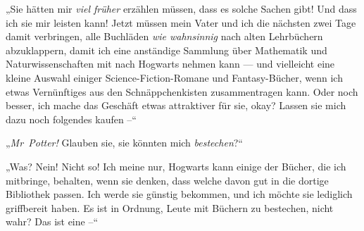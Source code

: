 „Sie hätten mir \emph{viel früher} erzählen müssen, dass es solche Sachen gibt! Und dass ich sie mir leisten kann! Jetzt müssen mein Vater und ich die nächsten zwei Tage damit verbringen, alle Buchläden \emph{wie wahnsinnig} nach alten Lehrbüchern abzuklappern, damit ich eine anständige Sammlung über Mathematik und Naturwissenschaften mit nach Hogwarts nehmen kann — und vielleicht eine kleine Auswahl einiger Science-Fiction-Romane und Fantasy-Bücher, wenn ich etwas Vernünftiges aus den Schnäppchenkisten zusammentragen kann. Oder noch besser, ich mache das Geschäft etwas attraktiver für sie, okay? Lassen sie mich dazu noch folgendes kaufen –“

„\emph{Mr~Potter!} Glauben sie, sie könnten mich \emph{bestechen}?“

„Was? Nein! Nicht so! Ich meine nur, Hogwarts kann einige der Bücher, die ich mitbringe, behalten, wenn sie denken, dass welche davon gut in die dortige Bibliothek passen. Ich werde sie günstig bekommen, und ich möchte sie lediglich griffbereit haben. Es ist in Ordnung, Leute mit Büchern zu bestechen, nicht wahr? Das ist eine –“

